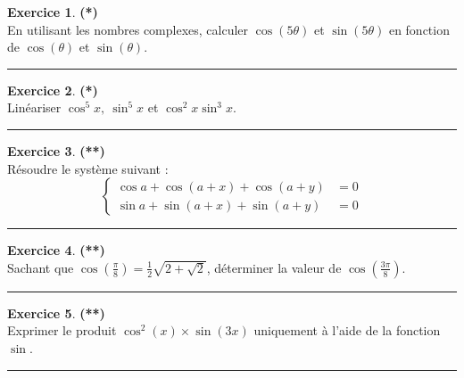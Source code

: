 \documentclass[a4paper,11pt]{article}
\theoremstyle{definition}
\newtheorem{exo}{Exercice} %
\begin{document}
\begin{minipage}{1\linewidth}
	\begin{minipage}[t]{0.48\linewidth}
		\raggedright
		
		
		\begin{exo}\textbf{(*)}\quad\\[0.2cm]
			 En utilisant les nombres complexes, calculer $\cos (5\theta)$ et
			$\sin(5\theta)$ en fonction de $\cos(\theta)$ et $\sin(\theta)$.
			
			\centering
			\rule{1\linewidth}{0.6pt}
		\end{exo}
		
		\begin{exo}\textbf{(*)}\quad\\[0.2cm]
		Linéariser $\cos^5x,\ \sin^5x$ et $\cos^2x \sin^3x$.

		\centering
		\rule{1\linewidth}{0.6pt}
	\end{exo}
		\begin{exo}\textbf{(**)}\quad\\[0.2cm]
			 Résoudre le système suivant : 
			\[
			\left\{\begin{aligned}
			\cos a + \cos(a+x)+\cos(a+y) &=0 \\
			\sin a + \sin(a+x)+\sin(a+y) &=0
			\end{aligned}\right.
			\]
			\centering
			\rule{1\linewidth}{0.6pt}
		\end{exo}
		
				\begin{exo}\textbf{(**)}\quad\\[0.2cm]
			Sachant que $\cos(\frac{\pi}{8})=\frac{1}{2}\sqrt{2+\sqrt 2}$, déterminer la valeur de $\cos(\frac{3\pi}{8})$.
			
			\centering
			\rule{1\linewidth}{0.6pt}
		\end{exo}
		
	\end{minipage}	
	\hfill\vrule\hfill
	\begin{minipage}[t]{0.48\linewidth}
		\raggedright
		
		\begin{exo}\textbf{(**)}\quad\\[0.2cm]
			Exprimer le produit $\cos^2(x)\times \sin(3x)$ uniquement à l'aide de la fonction $\sin$.
			
			\centering
			\rule{1\linewidth}{0.6pt}
		\end{exo}
		
		
		


\end{minipage}
\end{minipage}
\end{document}
